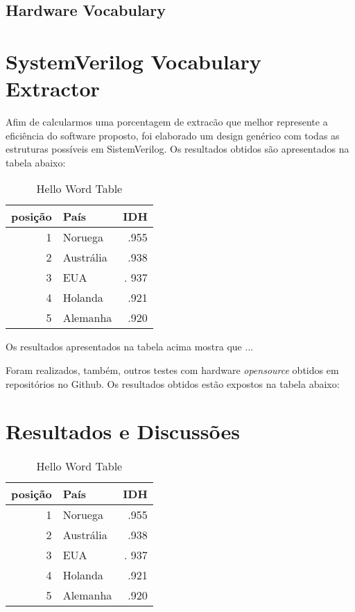 \documentclass[12pt, twocolumn, a4paper]{article}
\begin{document}
	\subsection{Hardware Vocabulary} 
	\section{SystemVerilog Vocabulary Extractor}
	
	\quad Afim de calcularmos uma porcentagem de extracão que melhor represente a eficiência do software proposto, foi elaborado um design genérico com todas as estruturas possíveis em SistemVerilog. Os resultados obtidos são apresentados na tabela abaixo:

\begin{table}[h]
\centering
\caption{Hello Word Table}
	\begin{tabular}{r|l|r}
	\hline
	posição & País & IDH\\
	\hline
	1 & Noruega        & .955 \\
	\hline
	2 & Austrália 	   & .938 \\
	\hline
	3 & EUA            &. 937 \\
	\hline
	4 & Holanda        & .921 \\
	\hline
	5 & Alemanha       & .920 \\
	\hline
	
	\end{tabular}

\end{table}

\quad Os resultados apresentados na tabela acima mostra que ...

	Foram realizados, também, outros testes com hardware \textit{opensource} obtidos em repositórios no Github. Os resultados obtidos estão expostos na tabela abaixo:
	\section{Resultados e Discussões}
	
	\begin{table}[h]
\centering
\caption{Hello Word Table}
	\begin{tabular}{r|l|r}
	\hline
	posição & País & IDH\\
	\hline
	1 & Noruega        & .955 \\
	\hline
	2 & Austrália 	   & .938 \\
	\hline
	3 & EUA            &. 937 \\
	\hline
	4 & Holanda        & .921 \\
	\hline
	5 & Alemanha       & .920 \\
	\hline
	
	\end{tabular}

\end{table}
	
  
	
	
	
\end{document}
